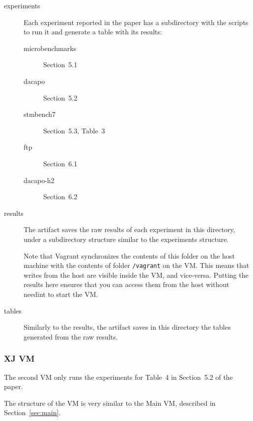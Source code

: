 \documentclass[12pt]{article}
\begin{document}
\begin{description}
    \item[experiments]  Each experiment reported in the paper has a
        subdirectory with the scripts to run it and generate a table with its
        results:

        \begin{description}

            \item[microbenchmarks] Section~5.1

            \item[dacapo] Section~5.2

            \item[stmbench7] Section~5.3, Table~3

            \item[ftp] Section~6.1

            \item[dacapo-h2] Section~6.2

        \end{description}

    \item[results]  The artifact saves the raw results of each experiment in
        this directory, under a subdirectory structure similar to the
        experiments structure.

        Note that Vagrant synchronizes the contents of this folder on the host
        machine with the contents of folder \texttt{/vagrant} on the VM.
        This means that writes from the host are visible inside the VM, and
        vice-versa.  Putting the results here ensures that you can access them
        from the host without needint to start the VM.

    \item[tables]  Similarly to the results, the artifact saves in this
        directory the tables generated from the raw results.

\end{description}

\subsubsection{XJ VM}

The second VM only runs the experiments for Table~4 in Section~5.2 of the paper.

The structure of the VM is very similar to the Main VM, described in
Section~\ref{sec:main}.
\end{document}
